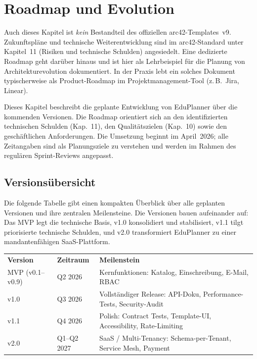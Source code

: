 \section{Roadmap und Evolution}

\begin{hinweis}
Auch dieses Kapitel ist \emph{kein} Bestandteil des offiziellen arc42-Templates~v9.
Zukunftspläne und technische Weiterentwicklung sind im arc42-Standard unter
Kapitel~11 (Risiken und technische Schulden) angesiedelt. Eine dedizierte Roadmap
geht darüber hinaus und ist hier als Lehrbeispiel für die Planung von
Architekturevolution dokumentiert. In der Praxis lebt ein solches Dokument
typischerweise als Product-Roadmap im Projektmanagement-Tool (z.\,B.\ Jira, Linear).
\end{hinweis}

Dieses Kapitel beschreibt die geplante Entwicklung von EduPlanner über die kommenden Versionen. Die Roadmap orientiert sich an den identifizierten technischen Schulden (Kap.~11), den Qualitätszielen (Kap.~10) sowie den geschäftlichen Anforderungen. Die Umsetzung beginnt im April~2026; alle Zeitangaben sind als Planungsziele zu verstehen und werden im Rahmen des regulären Sprint-Reviews angepasst.

\subsection{Versionsübersicht}

Die folgende Tabelle gibt einen kompakten Überblick über alle geplanten Versionen und ihre zentralen Meilensteine. Die Versionen bauen aufeinander auf: Das MVP legt die technische Basis, v1.0 konsolidiert und stabilisiert, v1.1 tilgt priorisierte technische Schulden, und v2.0 transformiert EduPlanner zu einer mandantenfähigen SaaS-Plattform.

\begin{tabularx}{\textwidth}{L{2.5cm} C{2.5cm} X}
  \color{white}\textbf{Version} & \color{white}\textbf{Zeitraum} & \color{white}\textbf{Meilenstein} \\
  MVP (v0.1--v0.9) & Q2 2026 & Kernfunktionen: Katalog, Einschreibung, E-Mail, RBAC \\
  v1.0 & Q3 2026 & Vollständiger Release: API-Doku, Performance-Tests, Security-Audit \\
  v1.1 & Q4 2026 & Polish: Contract Tests, Template-UI, Accessibility, Rate-Limiting \\
  v2.0 & Q1--Q2 2027 & SaaS / Multi-Tenancy: Schema-per-Tenant, Service Mesh, Payment \\
\end{tabularx}

